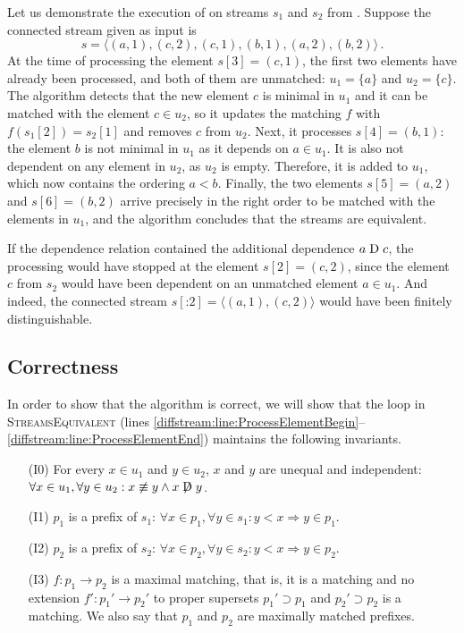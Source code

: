 \begin{example}
    Let us demonstrate the execution of  on streams $s_1$ and $s_2$ from
    . Suppose the connected stream given as input
    is
    \[s=\langle (a, 1), (c, 2), (c, 1), (b, 1), (a, 2), (b, 2)\rangle \, .\]
    At the time of processing
    the element $s[3]=(c,1)$, the first two elements have already been processed, and both of them are
    unmatched: $u_1=\{a\}$ and $u_2=\{c\}$. The algorithm detects that the new element $c$ is minimal in
    $u_1$ and it can be matched with the element $c\in u_2$, so it updates the matching $f$ with
    $f(s_1[2])=s_2[1]$ and removes $c$ from $u_2$. Next, it processes $s[4]=(b,1)$: the element $b$
    is not minimal in $u_1$ as it depends on $a\in u_1$. It is also not dependent on any element in $u_2$,
    as $u_2$ is empty. Therefore, it is added to $u_1$, which now contains the ordering $a<b$. Finally,
    the two elements $s[5]=(a,2)$ and $s[6]=(b,2)$ arrive precisely in the right order to be matched with
    the elements in $u_1$, and the algorithm concludes that the streams are equivalent.

    If the dependence relation contained the additional dependence $a\mathrel{\mathrm{D}} c$, the processing would have
    stopped at the element $s[2]=(c,2)$, since the element $c$ from $s_2$ would have been dependent on an
    unmatched element $a\in u_1$. And indeed, the connected stream $s[\mathbin{:} 2]= \langle (a, 1), (c, 2)\rangle$
    would have been finitely distinguishable.
\end{example}

\subsection{Correctness}
\label{diffstream:sec:correctness}

In order to show that the algorithm is correct, we will show that
the loop in \textsc{StreamsEquivalent} (lines \ref{diffstream:line:ProcessElementBegin}--\ref{diffstream:line:ProcessElementEnd}) maintains the following invariants.
\begin{enumerate}
  \item[(I0)] For every $x\in u_1$ and $y\in u_2$, $x$ and $y$
    are unequal and independent:
    $\forall x\in u_1, \forall y\in u_2 : x\not\equiv y \land
    x\not\mathrel{\mathrm{D}} y$.
  \item[(I1)] $p_1$ is a prefix of $s_1$:
    $\forall x\in p_1, \forall y\in s_1 : y < x \Rightarrow y \in p_1$.
  \item[(I2)] $p_2$ is a prefix of $s_2$:
    $\forall x\in p_2, \forall y\in s_2 : y < x \Rightarrow y \in p_2$.
  \item[(I3)] $f\colon p_1\to p_2$ is a maximal matching, that is, it is a matching
    and no extension $f'\colon p_1'\to p_2'$ to proper supersets
    $p_1'\supset p_1$ and $p_2'\supset p_2$ is
    a matching. We also say that $p_1$ and $p_2$ are maximally matched
    prefixes.
\end{enumerate}

